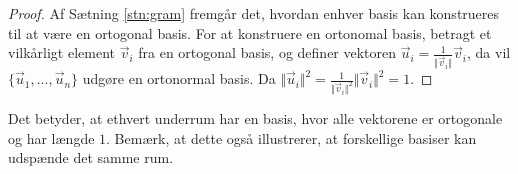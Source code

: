 \begin{proof}
Af Sætning \ref{stn:gram} fremgår det, hvordan enhver basis kan konstrueres til at være en ortogonal basis. 
For at konstruere en ortonomal basis, betragt et vilkårligt element $\vec{v}_i$ fra en ortogonal basis, og definer vektoren $\vec{u}_i = \frac{1}{\Vert\vec{v}_i\Vert}\vec{v}_i$, da vil $\{\vec{u}_1,...,\vec{u}_n\}$ udgøre en ortonormal basis. 
Da $\Vert\vec{u}_i\Vert^2 = \frac{1}{\Vert\vec{v}_i\Vert^2}\Vert\vec{v}_i\Vert^2 = 1$.
\end{proof}
Det betyder, at ethvert underrum har en basis, hvor alle vektorene er ortogonale og har længde $1$.
Bemærk, at dette også illustrerer, at forskellige basiser kan udspænde det samme rum. 



 